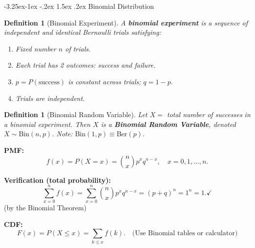 \documentclass{article}
\makeatletter
\newtheorem{definition}[theorem]{Definition}
\theoremstyle{remark}
\newlength{\subsecindent}
\renewcommand\subsection{\@startsection{subsection}{2}{\subsecindent}%
  {-3.25ex\@plus -1ex \@minus -.2ex}%
  {1.5ex \@plus .2ex}%
  {\normalfont\large\bfseries}}
\newenvironment{sub}{%
  \begin{list}{}{%
    \setlength{\leftmargin}{4em}%
    \setlength{\rightmargin}{0pt}%
    \setlength{\topsep}{0pt}%
    \setlength{\partopsep}{0pt}%
    \setlength{\parsep}{\parskip}%
    \setlength{\itemsep}{\parskip}%
  }\item\relax
}{\end{list}}
\makeatother
\begin{document}
\subsection{Binomial Distribution}
\begin{sub}

\begin{definition}[Binomial Experiment]
  A \textbf{binomial experiment} is a sequence of independent and identical
  Bernoulli trials satisfying:
  \begin{enumerate}
    \item Fixed number $n$ of trials.
    \item Each trial has 2 outcomes: success and failure.
    \item $p = P(\text{success})$ is constant across trials; $q = 1 - p$.
    \item Trials are independent.
  \end{enumerate}
\end{definition}

\begin{definition}[Binomial Random Variable]
  Let $X =$ total number of successes in a binomial experiment. Then $X$
  is a \textbf{Binomial Random Variable}, denoted $X \sim \text{Bin}(n, p)$.
  Note: $\text{Bin}(1, p) \equiv \text{Ber}(p)$.
\end{definition}

\textbf{PMF:}
\begin{equation}
  f(x) = P(X = x) = \binom{n}{x} p^x q^{n-x}, \quad x = 0, 1, \ldots, n.
  \label{eq:binom-pmf}
\end{equation}

\textbf{Verification (total probability):}
\[
  \sum_{x=0}^{n} f(x) = \sum_{x=0}^{n} \binom{n}{x} p^x q^{n-x} = (p + q)^n = 1^n = 1. \checkmark
\]
(by the Binomial Theorem)

\textbf{CDF:}
\[
  F(x) = P(X \le x) = \sum_{k \le x} f(k). \quad \text{(Use Binomial tables or calculator)}
\]

\end{sub}
\end{document}
